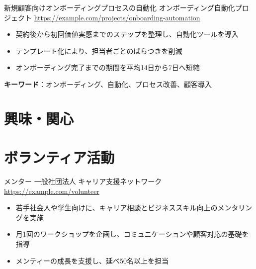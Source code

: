 \documentclass[a4paper, serif, 10pt]{moderncv}
\begin{document}
        {新規顧客向けオンボーディングプロセスの自動化}
        {オンボーディング自動化プロジェクト}
        {\url{https://example.com/projects/onboarding-automation}}
        {}
        {\begin{itemize}
\item 契約後から初回価値実感までのステップを整理し、自動化ツールを導入
\item テンプレート化により、担当者ごとのばらつきを削減
\item オンボーディング完了までの期間を平均14日から7日へ短縮
\end{itemize}
\textbf{キーワード}：オンボーディング、自動化、プロセス改善、顧客導入}
\section{興味・関心}

\section{ボランティア活動}

        {メンター}
        {一般社団法人 キャリア支援ネットワーク}
        {\url{https://example.com/volunteer}}
        {}
        {\begin{itemize}
\item 若手社会人や学生向けに、キャリア相談とビジネススキル向上のメンタリングを実施
\item 月1回のワークショップを企画し、コミュニケーションや顧客対応の基礎を指導
\item メンティーの成長を支援し、延べ50名以上を担当
\end{itemize}}
    
\end{document}
